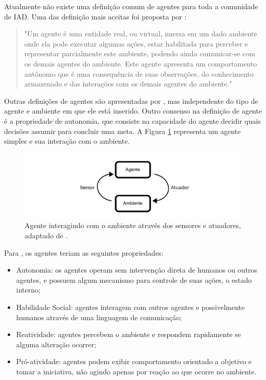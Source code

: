 Atualmente não existe uma definição comum de agentes para toda a comunidade de IAD. Uma das definição mais aceitas foi proposta por \citet{ferber1991agent}:
\begin{quotation}
"Um agente é uma entidade real, ou virtual, imersa em um dado ambiente onde ela pode executar algumas ações, estar habilitada para perceber e representar parcialmente este ambiente, podendo ainda comunicar-se com os demais agentes do ambiente. Este agente apresenta um comportamento autônomo que é uma consequência de suas observações, do conhecimento armazenado e das interações com os demais agentes do ambiente."
\end{quotation}

Outras definições de agentes são apresentadas por \cite{wooldridge1995intelligent,franklin1996agent,russell2002artificial}, mas independente do tipo de agente e ambiente em que ele está inserido. Outro consenso na definição de agente é a propriedade de autonomia, que consiste na capacidade do agente decidir quais decisões assumir para concluir uma meta. A Figura \ref{fig:agente} representa um agente simples e sua interação com o ambiente.

\begin{figure}[ht]
\centering
\includegraphics[scale=0.8]{imagens/agente.pdf}
\caption{Agente interagindo com o ambiente através dos sensores e atuadores, adaptado de \cite{russell2002artificial}.}
\label{fig:agente}
\end{figure}

Para \citet{wooldridge1995intelligent}, os agentes teriam as seguintes propriedades:

\begin{itemize}
\item Autonomia: os agentes operam sem intervenção direta de humanos ou outros agentes, e possuem algum mecanismo para controle de suas ações, o estado interno;
\item Habilidade Social: agentes interagem com outros agentes e possivelmente humanos através de uma linguagem de comunicação;
\item Reatividade: agentes percebem o ambiente e respondem rapidamente se alguma alteração ocorrer;
\item Pró-atividade: agentes podem exibir comportamento orientado a objetivo e tomar a iniciativa, não agindo apenas por reação ao que ocorre no ambiente.
\end{itemize}

